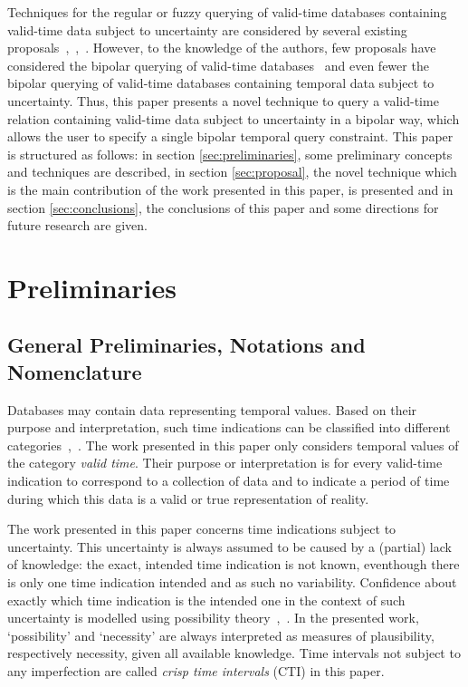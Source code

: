 \documentclass[runningheads,a4paper]{llncs}
\begin{document}
Techniques for the regular or fuzzy querying of valid-time databases containing valid-time data subject to uncertainty are considered by several existing proposals~\cite{Pons2012ijcis},~\cite{Pons2012ipmu},~\cite{Pons2013ijufkbs}. However, to the knowledge of the authors, few proposals have considered the bipolar querying of valid-time databases~\cite{Billiet2011fqas} and even fewer the bipolar querying of valid-time databases containing temporal data subject to uncertainty. Thus, this paper presents a novel technique to query a valid-time relation containing valid-time data subject to uncertainty in a bipolar way, which allows the user to specify a single bipolar temporal query constraint. This paper is structured as follows: in section \ref{sec:preliminaries}, some preliminary concepts and techniques are described, in section \ref{sec:proposal}, the novel technique which is the main contribution of the work presented in this paper, is presented and in section \ref{sec:conclusions}, the conclusions of this paper and some directions for future research are given.


\section{Preliminaries\label{sec:preliminaries}}

\subsection{General Preliminaries, Notations and Nomenclature}
Databases may contain data representing temporal values. Based on their purpose and interpretation, such time indications can be classified into different categories~\cite{Bohlen1998lncs},~\cite{Billiet2012ipmu}. The work presented in this paper only considers temporal values of the category \emph{valid time}. Their purpose or interpretation is for every valid-time indication to correspond to a collection of data and to indicate a period of time during which this data is a valid or true representation of reality.

The work presented in this paper concerns time indications subject to uncertainty. This uncertainty is always assumed to be caused by a (partial) lack of knowledge: the exact, intended time indication is not known, eventhough there is only one time indication intended and as such no variability. Confidence about exactly which time indication is the intended one in the context of such uncertainty is modelled using possibility theory~\cite{Dubois1988},~\cite{Pons2013ijufkbs}. In the presented work, `possibility' and `necessity' are always interpreted as measures of plausibility, respectively necessity, given all available knowledge. Time intervals not subject to any imperfection are called \emph{crisp time intervals} (CTI) in this paper.
\end{document}
